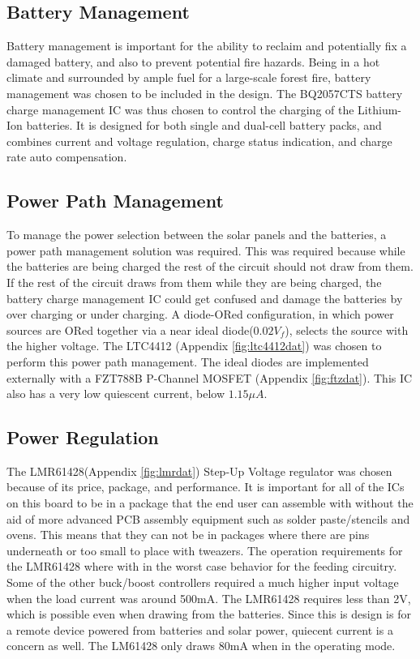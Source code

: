 \documentclass{article}
\numberwithin{figure}{section}
\numberwithin{equation}{section}
\begin{document}
{\subsection{Battery Management} \label{sect:battery_just}
Battery management is important for the ability to reclaim and potentially fix a damaged battery, and also to prevent potential fire hazards. Being in a hot climate and surrounded by ample fuel for a large-scale forest fire, battery management was chosen to be included in the design. The BQ2057CTS battery charge management IC was thus chosen to control the charging of the Lithium-Ion batteries. It is designed for both single and dual-cell battery packs, and combines current and voltage regulation, charge status indication, and charge rate auto compensation.

\subsection{Power Path Management} \label{sect_pow_just}
To manage the power selection between the solar panels and the batteries, a power path management solution was required. This was required because while the batteries are being charged the rest of the circuit should not draw from them. If the rest of the circuit draws from them while they are being charged, the battery charge management IC could get confused and damage the batteries by over charging or under charging. A diode-ORed configuration, in which power sources are ORed together via a near ideal diode($0.02V_f$), selects the source with the higher voltage. The LTC4412 (Appendix \ref{fig:ltc4412dat}) was chosen to perform this power path management. The ideal diodes are implemented externally with a FZT788B P-Channel MOSFET (Appendix \ref{fig:ftzdat}). This IC also has a very low quiescent current, below $1.15\mu A$.

\subsection{Power Regulation} \label{sect:reg_just}
The LMR61428(Appendix \ref{fig:lmrdat}) Step-Up Voltage regulator was chosen because of its price, package, and performance. It is important for all of the ICs on this board to be in a package that the end user can assemble with without the aid of more advanced PCB assembly equipment such as solder paste/stencils and ovens. This means that they can not be in packages where there are pins underneath or too small to place with tweazers. The operation requirements for the LMR61428 where with in the worst case behavior for the feeding circuitry. Some of the other buck/boost controllers required a much higher input voltage when the load current was around 500mA. The LMR61428 requires less than 2V, which is possible even when drawing from the batteries. Since this is design is for a remote device powered from batteries and solar power, quiecent current is a concern as well. The LM61428 only draws 80mA when in the operating mode.

}
\end{document}
